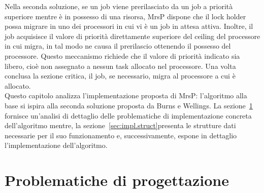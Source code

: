 Nella seconda soluzione, se un job viene prerilasciato da un job a priorità superiore mentre è in possesso di una risorsa, MrsP dispone che il lock holder possa migrare in uno dei processori in cui vi è un job in attesa attiva. Inoltre, il job acquisisce il valore di priorità direttamente superiore del ceiling del processore in cui migra, in tal modo ne causa il prerilascio ottenendo il possesso del processore. Questo meccanismo richiede che il valore di priorità indicato sia libero, cioè non assegnato a nessun task allocato nel processore. Una volta conclusa la sezione critica, il job, se necessario, migra al processore a cui è allocato.\\

Questo capitolo analizza l'implementazione proposta di MrsP: l'algoritmo alla base si ispira alla seconda soluzione proposta da Burns e Wellings. La sezione~\ref{sec:impl.design} fornisce un'analisi di dettaglio delle problematiche di implementazione concreta dell'algoritmo mentre, la sezione~\ref{sec:impl.struct}presenta le strutture dati necessarie per il suo funzionamento e, successivamente, espone in dettaglio l'implementazione dell'algoritmo.

\section{Problematiche di progettazione}
\label{sec:impl.design}

